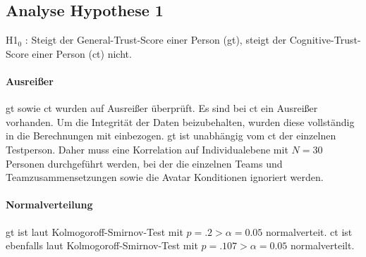 \documentclass[a4paper,11pt]{article}%
\renewcommand{\\}{\vspace*{0.5\baselineskip} \newline}
\begin{document}
\newpage
	\subsection{Analyse Hypothese 1}
H1$_{0}$ : Steigt der General-Trust-Score einer Person (\ac{gt}), steigt der Cognitive-Trust-Score einer Person (\ac{ct}) nicht.



\paragraph{Ausreißer}
\ac{gt} sowie \ac{ct} wurden auf Ausreißer überprüft. 
Es sind bei \ac{ct} ein Ausreißer vorhanden. Um die Integrität der Daten beizubehalten, wurden diese vollständig in die Berechnungen mit einbezogen. 
\ac{gt} ist unabhängig vom \ac{ct} der einzelnen Testperson. Daher muss eine Korrelation auf Individualebene mit $N=30$ Personen durchgeführt werden, bei der die einzelnen Teams und Teamzusammensetzungen sowie die Avatar Konditionen ignoriert werden. 

\paragraph{Normalverteilung}
\ac{gt} ist laut Kolmogoroff-Smirnov-Test mit $p = .2 > \alpha = 0.05$ normalverteit. 
\ac{ct} ist ebenfalls laut Kolmogoroff-Smirnov-Test mit $p = .107 > \alpha = 0.05$ normalverteilt. 
\end{document}

